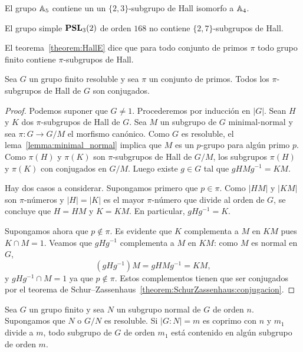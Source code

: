 \begin{example}
	El grupo $\mathbb{A}_5$ contiene un un $\{2,3\}$-subgrupo de Hall isomorfo a
	$\mathbb{A}_4$.
\end{example}

\begin{example}
	El grupo simple $\mathbf{PSL}_3(2)$ de orden $168$ no contiene $\{2,7\}$-subgrupos
	de Hall.
\end{example}

El teorema~\ref{theorem:HallE} dice que para todo conjunto de primos $\pi$
todo grupo finito contiene $\pi$-subgrupos de Hall.

\begin{theorem}[Hall]
	\label{theorem:HallC}
	Sea $G$ un grupo finito resoluble y sea $\pi$ un conjunto de primos. Todos los
	$\pi$-subgrupos de Hall de $G$ son conjugados.
\end{theorem}

\begin{proof}
	Podemos suponer que $G\ne1$. Procederemos por inducción en $|G|$.  Sean $H$
	y $K$ dos $\pi$-subgrupos de Hall de $G$. Sea $M$ un subgrupo de $G$
	minimal-normal y sea $\pi\colon G\to G/M$ el morfismo canónico. Como $G$ es
	resoluble, el lema~\ref{lemma:minimal_normal} implica que  $M$ es un
	$p$-grupo para algún primo $p$.  Como $\pi(H)$ y $\pi(K)$ son
	$\pi$-subgrupos de Hall de $G/M$, los subgrupos $\pi(H)$ y $\pi(K)$ con
	conjugados en $G/M$. Luego existe $g\in G$ tal que $gHMg^{-1}=KM$. 

	Hay dos casos a considerar. Supongamos primero que $p\in\pi$. Como $|HM|$ y
	$|KM|$ son $\pi$-números y $|H|=|K|$ es el mayor $\pi$-número que divide al
	orden de $G$, se concluye que $H=HM$ y $K=KM$. En particular, $gHg^{-1}=K$. 

	Supongamos ahora que $p\not\in\pi$. Es evidente que $K$ complementa a $M$ en
	$KM$ pues $K\cap M=1$. Veamos que $gHg^{-1}$ complementa a $M$ en $KM$:
	como $M$ es normal en $G$, 
	\[
	(gHg^{-1})M=gHMg^{-1}=KM,
	\]
	y $gHg^{-1}\cap M=1$ ya que $p\not\in\pi$. Estos complementos tienen que
	ser conjugados por el teorema de
	Schur--Zassenhaus~\ref{theorem:SchurZassenhaus:conjugacion}.
\end{proof}

\begin{corollary}
	Sea $G$ un grupo finito y sea $N$ un subgrupo normal de $G$ de orden $n$.
	Supongamos que $N$ o $G/N$ es resoluble. Si $|G:N|=m$ es coprimo con $n$ y
	$m_1$ divide a $m$, todo subgrupo de $G$ de orden $m_1$ está contenido en
	algún subgrupo de orden $m$.
\end{corollary}

